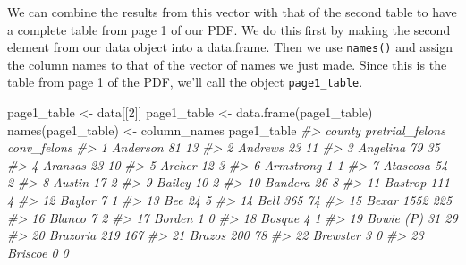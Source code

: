 \documentclass[
]{krantz}
\makeatletter
\newenvironment{Shaded}{\begin{snugshade}}{\end{snugshade}}
\newcommand{\CommentTok}[1]{\textcolor[rgb]{0.37,0.37,0.37}{\textit{#1}}}
\newcommand{\DecValTok}[1]{\textcolor[rgb]{0.06,0.06,0.06}{#1}}
\newcommand{\FunctionTok}[1]{\textcolor[rgb]{0,0,0}{#1}}
\newcommand{\NormalTok}[1]{#1}
\newcommand{\OtherTok}[1]{\textcolor[rgb]{0.37,0.37,0.37}{#1}}
\newenvironment{kframe}{%
\medskip{}
\setlength{\fboxsep}{.8em}
 \def\at@end@of@kframe{}%
 \ifinner\ifhmode%
  \def\at@end@of@kframe{\end{minipage}}%
  \begin{minipage}{\columnwidth}%
 \fi\fi%
 \def\FrameCommand##1{\hskip\@totalleftmargin \hskip-\fboxsep
 \colorbox{shadecolor}{##1}\hskip-\fboxsep
     \hskip-\linewidth \hskip-\@totalleftmargin \hskip\columnwidth}%
 \MakeFramed {\advance\hsize-\width
   \@totalleftmargin\z@ \linewidth\hsize
   \@setminipage}}%
 {\par\unskip\endMakeFramed%
 \at@end@of@kframe}
\renewenvironment{Shaded}{\begin{kframe}}{\end{kframe}}
\makeatother
\begin{document}
We can combine the results from this vector with that of the second table to have a complete table from page 1 of our PDF. We do this first by making the second element from our data object into a data.frame. Then we use \texttt{names()} and assign the column names to that of the vector of names we just made. Since this is the table from page 1 of the PDF, we'll call the object \texttt{page1\_table}.

\begin{Shaded}
\begin{Highlighting}[]
\NormalTok{page1\_table }\OtherTok{\textless{}{-}}\NormalTok{ data[[}\DecValTok{2}\NormalTok{]]}
\NormalTok{page1\_table }\OtherTok{\textless{}{-}} \FunctionTok{data.frame}\NormalTok{(page1\_table)}
\FunctionTok{names}\NormalTok{(page1\_table) }\OtherTok{\textless{}{-}}\NormalTok{ column\_names}
\NormalTok{page1\_table}
\CommentTok{\#\textgreater{}        county pretrial\_felons conv\_felons}
\CommentTok{\#\textgreater{} 1    Anderson              81          13}
\CommentTok{\#\textgreater{} 2     Andrews              23          11}
\CommentTok{\#\textgreater{} 3    Angelina              79          35}
\CommentTok{\#\textgreater{} 4     Aransas              23          10}
\CommentTok{\#\textgreater{} 5      Archer              12           3}
\CommentTok{\#\textgreater{} 6   Armstrong               1           1}
\CommentTok{\#\textgreater{} 7    Atascosa              54           2}
\CommentTok{\#\textgreater{} 8      Austin              17           2}
\CommentTok{\#\textgreater{} 9      Bailey              10           2}
\CommentTok{\#\textgreater{} 10    Bandera              26           8}
\CommentTok{\#\textgreater{} 11    Bastrop             111           4}
\CommentTok{\#\textgreater{} 12     Baylor               7           1}
\CommentTok{\#\textgreater{} 13        Bee              24           5}
\CommentTok{\#\textgreater{} 14       Bell             365          74}
\CommentTok{\#\textgreater{} 15      Bexar            1552         225}
\CommentTok{\#\textgreater{} 16     Blanco               7           2}
\CommentTok{\#\textgreater{} 17     Borden               1           0}
\CommentTok{\#\textgreater{} 18     Bosque               4           1}
\CommentTok{\#\textgreater{} 19  Bowie (P)              31          29}
\CommentTok{\#\textgreater{} 20   Brazoria             219         167}
\CommentTok{\#\textgreater{} 21     Brazos             200          78}
\CommentTok{\#\textgreater{} 22   Brewster               3           0}
\CommentTok{\#\textgreater{} 23    Briscoe               0           0}

\end{Highlighting}
\end{Shaded}
\end{document}
